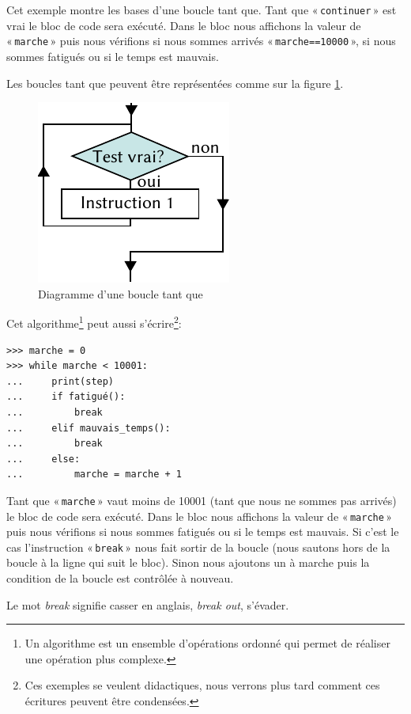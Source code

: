 Cet exemple montre les bases d'une boucle tant que. Tant que « \texttt{continuer} » est vrai le bloc de code sera exécuté. Dans le bloc nous affichons la valeur de « \texttt{marche} » puis nous vérifions si nous sommes arrivés « \texttt{marche==10000} », si nous sommes fatigués ou si le temps est mauvais.

Les boucles tant que peuvent être représentées comme sur la figure \ref{fig:Cf-while-fr}.
\begin{figure}[h!]
\centering
\includegraphics[scale=1.5]{images/Cf-while-fr.pdf}
\caption{Diagramme d'une boucle tant que}
\label{fig:Cf-while-fr}
\end{figure}

Cet algorithme\footnote{Un algorithme est un ensemble d'opérations ordonné qui permet de réaliser une opération plus complexe.} peut aussi s'écrire\footnote{Ces exemples se veulent didactiques, nous verrons plus tard comment ces écritures peuvent être condensées.}:

\begin{Verbatim}[frame=single,rulecolor=\color{gray}, label=ne pas saisir]
>>> marche = 0
>>> while marche < 10001:
...     print(step)
...     if fatigué():
...         break
...     elif mauvais_temps():
...         break
...     else:
...         marche = marche + 1 
\end{Verbatim}

Tant que « \texttt{marche} » vaut moins de 10001 (tant que nous ne sommes pas arrivés) le bloc de code sera exécuté. Dans le bloc nous affichons la valeur de « \texttt{marche} » puis nous vérifions si nous sommes fatigués ou si le temps est mauvais. Si c'est le cas l'instruction « \texttt{break} » nous fait sortir de la boucle (nous sautons hors de la boucle à la ligne qui suit le bloc). Sinon nous ajoutons un à marche puis la condition de la boucle est contrôlée à nouveau.

Le mot \emph{break} signifie casser en anglais, \emph{break out}, s'évader.\\


